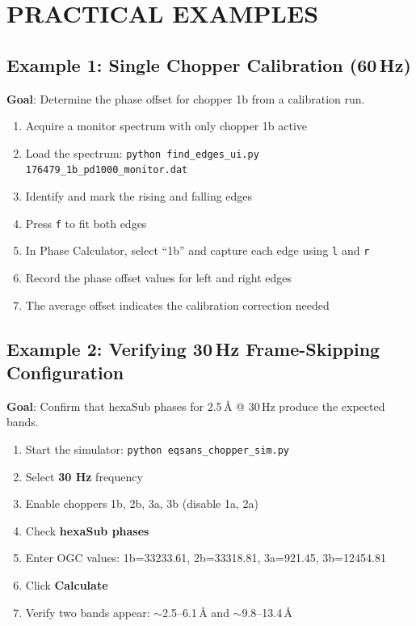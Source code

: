 \documentclass[tm]{ornltm}
\begin{document}
\section{PRACTICAL EXAMPLES}

\subsection{Example 1: Single Chopper Calibration (60\,Hz)}

\textbf{Goal}: Determine the phase offset for chopper 1b from a calibration run.

\begin{enumerate}
    \item Acquire a monitor spectrum with only chopper 1b active
    \item Load the spectrum: \texttt{python find\_edges\_ui.py 176479\_1b\_pd1000\_monitor.dat}
    \item Identify and mark the rising and falling edges
    \item Press \texttt{f} to fit both edges
    \item In Phase Calculator, select ``1b'' and capture each edge using \texttt{l} and \texttt{r}
    \item Record the phase offset values for left and right edges
    \item The average offset indicates the calibration correction needed
\end{enumerate}

\subsection{Example 2: Verifying 30\,Hz Frame-Skipping Configuration}

\textbf{Goal}: Confirm that hexaSub phases for 2.5\,\AA{} @ 30\,Hz produce the expected bands.

\begin{enumerate}
    \item Start the simulator: \texttt{python eqsans\_chopper\_sim.py}
    \item Select \textbf{30 Hz} frequency
    \item Enable choppers 1b, 2b, 3a, 3b (disable 1a, 2a)
    \item Check \textbf{hexaSub phases}
    \item Enter OGC values: 1b=33233.61, 2b=33318.81, 3a=921.45, 3b=12454.81
    \item Click \textbf{Calculate}
    \item Verify two bands appear: $\sim$2.5--6.1\,\AA{} and $\sim$9.8--13.4\,\AA{}
\end{enumerate}
\end{document}
